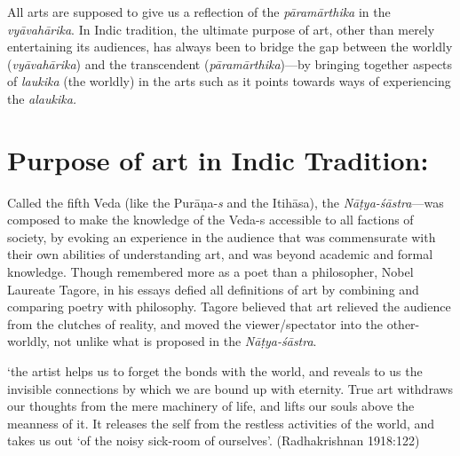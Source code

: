All arts are supposed to give us a reflection of the \textsl{pāramārthika} in the \textsl{vyāvahārika}. In Indic tradition, the ultimate purpose of art, other than merely entertaining its audiences, has always been to bridge the gap between the worldly (\textsl{vyāvahārika}) and the transcendent (\textsl{pāramārthika})---by bringing together aspects of \textsl{laukika} (the worldly) in the arts such as it points towards ways of experiencing the \textsl{alaukika.}

\section*{Purpose of art in Indic Tradition:}

Called the fifth Veda (like the Purāṇa-\textsl{s} and the Itihāsa), the \textsl{Nāṭya-śāstra}---was composed to make the knowledge of the \hbox{Veda-s} accessible to all factions of society, by evoking an experience in the audience that was commensurate with their own abilities of understanding art, and was beyond academic and formal knowledge. Though remembered more as a poet than a philosopher, Nobel Laureate Tagore, in his essays defied all definitions of art by combining and comparing poetry with philosophy. Tagore believed that art relieved the audience from the clutches of reality, and moved the viewer/spectator into the other-worldly, not unlike what is proposed in the \textsl{Nāṭya-śāstra}. 

\begin{myquote}
‘the artist helps us to forget the bonds with the world, and reveals to us the invisible connections by which we are bound up with eternity. True art withdraws our thoughts from the mere machinery of life, and lifts our souls above the meanness of it. It releases the self from the restless activities of the world, and takes us out ‘of the noisy sick-room of ourselves’.
\hfill (Radhakrishnan 1918:122)
\end{myquote}

